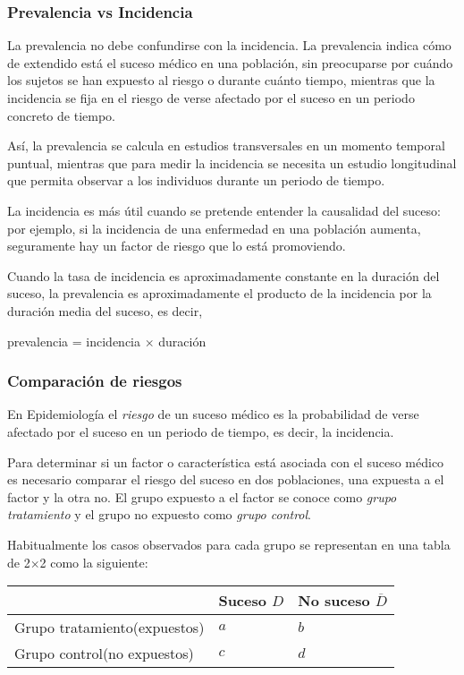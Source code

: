 \begin{frame}
\frametitle{Prevalencia vs Incidencia}
La prevalencia no debe confundirse con la incidencia. 
La prevalencia indica cómo de extendido está el suceso médico en una población, sin preocuparse por cuándo los sujetos se han expuesto al riesgo o durante cuánto tiempo, mientras que la incidencia se fija en el riesgo de verse afectado por el suceso en un periodo concreto de tiempo.

Así, la prevalencia se calcula en estudios transversales en un momento temporal puntual, mientras que para medir la incidencia se necesita un estudio longitudinal que permita observar a los individuos durante un periodo de tiempo.

La incidencia es más útil cuando se pretende entender la causalidad del suceso: por ejemplo, si la incidencia de una enfermedad en una población aumenta, seguramente hay un factor de riesgo que lo está promoviendo.

Cuando la tasa de incidencia es aproximadamente constante en la duración del suceso, la prevalencia es aproximadamente el producto de la incidencia por la duración media del suceso, es decir,
\begin{center}
  prevalencia = incidencia $\times$ duración
\end{center}
\end{frame}
  

\begin{frame}
\frametitle{Comparación de riesgos}
En Epidemiología el \emph{riesgo} de un suceso médico es la probabilidad de verse afectado por el suceso en un periodo de tiempo, es decir, la incidencia. 

Para determinar si un factor o característica está asociada con el suceso médico es necesario comparar el riesgo del suceso en dos poblaciones, una expuesta a el factor y la otra no. 
El grupo expuesto a el factor se conoce como \emph{grupo tratamiento} y el grupo no expuesto como \emph{grupo control}.

Habitualmente los casos observados para cada grupo se representan en una tabla de 2$\times$2 como la siguiente:

\begin{center}
  \begin{tabular}{|m{3cm}|m{3cm}<{\centering}|m{3cm}<{\centering}|}
  \cline{2-3}
  \multicolumn{1}{c|}{} & Suceso $D$ & No suceso $\overline D$\\ 
  \hline
  Grupo tratamiento\newline (expuestos) & $a$ & $b$\\ 
  \hline 
  Grupo control\newline (no expuestos) & $c$ & $d$\\ 
  \hline
  \end{tabular}
\end{center}
\end{frame}
  

